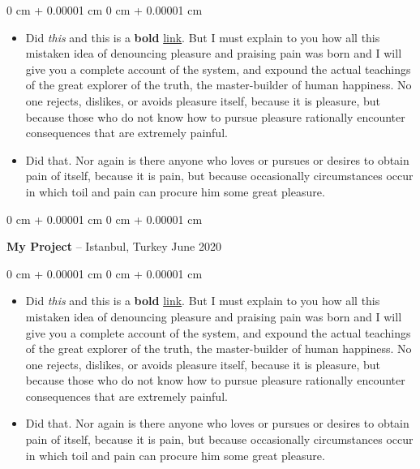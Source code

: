 \documentclass[10pt, letterpaper]{article}
\newenvironment{highlights}{
    \begin{itemize}[
        topsep=0.10 cm,
        parsep=0.10 cm,
        partopsep=0pt,
        itemsep=0pt,
        leftmargin=0 cm + 10pt
    ]
}{
    \end{itemize}
} %
\newenvironment{onecolentry}{
    \begin{adjustwidth}{
        0 cm + 0.00001 cm
    }{
        0 cm + 0.00001 cm
    }
}{
    \end{adjustwidth}
} %
\newenvironment{twocolentry}[2][]{
    \onecolentry
    \def\secondColumn{#2}
    \setcolumnwidth{\fill, 4.5 cm}
    \begin{paracol}{2}
}{
    \switchcolumn \raggedleft \secondColumn
    \end{paracol}
    \endonecolentry
} %
\begin{document}
        \vspace{0.10 cm}
        \begin{onecolentry}
            \begin{highlights}
                \item Did \textit{this} and this is a \textbf{bold} \href{https://example.com}{link}. But I must explain to you how all this mistaken idea of denouncing pleasure and praising pain was born and I will give you a complete account of the system, and expound the actual teachings of the great explorer of the truth, the master-builder of human happiness. No one rejects, dislikes, or avoids pleasure itself, because it is pleasure, but because those who do not know how to pursue pleasure rationally encounter consequences that are extremely painful.
                \item Did that. Nor again is there anyone who loves or pursues or desires to obtain pain of itself, because it is pain, but because occasionally circumstances occur in which toil and pain can procure him some great pleasure.
            \end{highlights}
        \end{onecolentry}


        \vspace{0.2 cm}

        \begin{twocolentry}{
            June 2020
        }
            \textbf{My Project} -- Istanbul, Turkey\end{twocolentry}

        \vspace{0.10 cm}
        \begin{onecolentry}
            \begin{highlights}
                \item Did \textit{this} and this is a \textbf{bold} \href{https://example.com}{link}. But I must explain to you how all this mistaken idea of denouncing pleasure and praising pain was born and I will give you a complete account of the system, and expound the actual teachings of the great explorer of the truth, the master-builder of human happiness. No one rejects, dislikes, or avoids pleasure itself, because it is pleasure, but because those who do not know how to pursue pleasure rationally encounter consequences that are extremely painful.
                \item Did that. Nor again is there anyone who loves or pursues or desires to obtain pain of itself, because it is pain, but because occasionally circumstances occur in which toil and pain can procure him some great pleasure.
            \end{highlights}
        \end{onecolentry}
\end{document}
